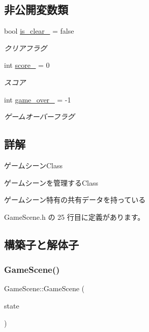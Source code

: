 \subsection*{非公開変数類}
\begin{DoxyCompactItemize}
\item 
bool \mbox{\hyperlink{class_game_scene_a48cf67b81c80718df80ee03aa6e73e74}{is\+\_\+clear\+\_\+}} = false
\begin{DoxyCompactList}\small\item\em クリアフラグ \end{DoxyCompactList}\item 
int \mbox{\hyperlink{class_game_scene_afe49ee089b9ad8415f7ab432a3c554aa}{score\+\_\+}} = 0
\begin{DoxyCompactList}\small\item\em スコア \end{DoxyCompactList}\item 
int \mbox{\hyperlink{class_game_scene_a92b5476dc1536c43b604bef51cc36c70}{game\+\_\+over\+\_\+}} = -\/1
\begin{DoxyCompactList}\small\item\em ゲームオーバーフラグ \end{DoxyCompactList}\end{DoxyCompactItemize}


\subsection{詳解}
ゲームシーン\+Class 

ゲームシーンを管理する\+Class

ゲームシーン特有の共有データを持っている 

 Game\+Scene.\+h の 25 行目に定義があります。



\subsection{構築子と解体子}
\mbox{\label{class_game_scene_a25e9e82ce85255dac27cd6489751bd40}} 
\subsubsection{\texorpdfstring{Game\+Scene()}{GameScene()}}
{\footnotesize\ttfamily Game\+Scene\+::\+Game\+Scene (\begin{DoxyParamCaption}\item[{\mbox{\hyperlink{class_scene_base_1_1_state_base}{State\+Base}} $\ast$}]{state }\end{DoxyParamCaption})\hspace{0.3cm}{\ttfamily [inline]}}



